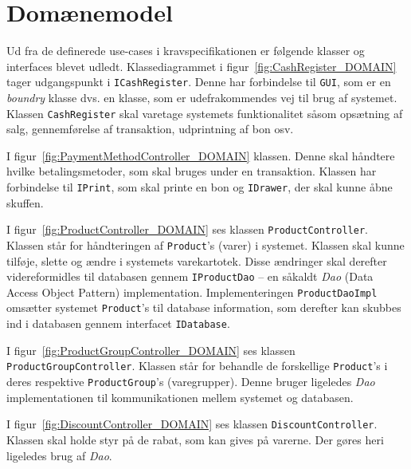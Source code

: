 \section{Domænemodel}
Ud fra de definerede use-cases i kravspecifikationen er følgende klasser og interfaces blevet udledt. Klassediagrammet i figur~\ref{fig:CashRegister_DOMAIN} tager udgangspunkt i \texttt{ICashRegister}. Denne har forbindelse til \texttt{GUI}, som er en \textit{boundry} klasse dvs. en klasse, som er udefrakommendes vej til brug af systemet. Klassen \texttt{CashRegister} skal varetage systemets funktionalitet såsom opsætning af salg, gennemførelse af transaktion, udprintning af bon osv.


I figur~\ref{fig:PaymentMethodController_DOMAIN} klassen. Denne skal håndtere hvilke betalingsmetoder, som skal bruges under en transaktion. Klassen har forbindelse til \texttt{IPrint}, som skal printe en bon og \texttt{IDrawer}, der skal kunne åbne skuffen.

I figur~\ref{fig:ProductController_DOMAIN} ses klassen \texttt{ProductController}. Klassen står for håndteringen af \texttt{Product}'s (varer) i systemet. Klassen skal kunne tilføje, slette og ændre i systemets varekartotek. Disse ændringer skal derefter videreformidles til databasen gennem \texttt{IProductDao} -- en såkaldt \textit{Dao} (Data Access Object Pattern) implementation. Implementeringen \texttt{ProductDaoImpl} omsætter systemet \texttt{Product}'s til database information, som derefter kan skubbes ind i databasen gennem interfacet \texttt{IDatabase}.


I figur~\ref{fig:ProductGroupController_DOMAIN} ses klassen \texttt{ProductGroupController}. Klassen står for behandle de forskellige \texttt{Product}'s i deres respektive \texttt{ProductGroup}'s (varegrupper). Denne bruger ligeledes \textit{Dao} implementationen til kommunikationen mellem systemet og databasen.


I figur~\ref{fig:DiscountController_DOMAIN} ses klassen \texttt{DiscountController}. Klassen skal holde styr på de rabat, som kan gives på varerne. Der gøres heri ligeledes brug af \textit{Dao}.


